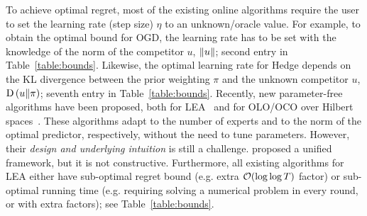To achieve optimal regret, most of the existing online algorithms require the
user to set the learning rate (step size) $\eta$ to an unknown/oracle
value.  For example, to obtain the optimal bound for \ac{OGD}, the learning
rate has to be set with the knowledge of the norm of the competitor $u$,
$\left\|{u}\right\|$; second entry in Table~\ref{table:bounds}.  Likewise, the optimal
learning rate for Hedge depends on the KL divergence between the prior
weighting $\pi$ and the unknown competitor $u$, $\operatorname{D}\left({u}\middle\|{\pi}\right)$; seventh entry in
Table~\ref{table:bounds}.  Recently, new parameter-free algorithms have been
proposed, both for \ac{LEA}~\cite{Chaudhuri-Freund-Hsu-2009, Chernov-Vovk-2010,
Luo-Schapire-2014, Luo-Schapire-2015, Koolen-van-Erven-2015,
Foster-Rakhlin-Sridharan-2015} and for \ac{OLO}/\ac{OCO} over Hilbert
spaces~\cite{Streeter-McMahan-2012, Orabona-2013, McMahan-Abernethy-2013,
McMahan-Orabona-2014, Orabona-2014}.  These algorithms adapt to the number of
experts and to the norm of the optimal predictor, respectively, without the
need to tune parameters. However, their \emph{design and underlying intuition}
is still a challenge.  \citet{Foster-Rakhlin-Sridharan-2015} proposed a unified
framework, but it is not constructive.  Furthermore, all existing algorithms
for LEA either have sub-optimal regret bound (e.g. extra $\mathcal{O}(\log \log T)$
factor) or sub-optimal running time (e.g.  requiring solving a numerical
problem in every round, or with extra factors); see Table~\ref{table:bounds}.

